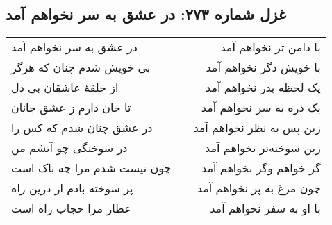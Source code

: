 \begin{center}
\section*{غزل شماره ۲۷۳: در عشق به سر نخواهم آمد}
\label{sec:273}
\begin{longtable}{l p{0.5cm} r}
در عشق به سر نخواهم آمد
&&
با دامن تر نخواهم آمد
\\
بی خویش شدم چنان که هرگز
&&
با خویش دگر نخواهم آمد
\\
از حلقهٔ عاشقان بی دل
&&
یک لحظه بدر نخواهم آمد
\\
تا جان دارم ز عشق جانان
&&
یک ذره به سر نخواهم آمد
\\
در عشق چنان شدم که کس را
&&
زین پس به نظر نخواهم آمد
\\
در سوختگی چو آتشم من
&&
زین سوخته‌تر نخواهم آمد
\\
چون نیست شدم مرا چه باک است
&&
گر خواهم وگر نخواهم آمد
\\
پر سوخته بادم ار درین راه
&&
چون مرغ به پر نخواهم آمد
\\
عطار مرا حجاب راه است
&&
با او به سفر نخواهم آمد
\\
\end{longtable}
\end{center}
